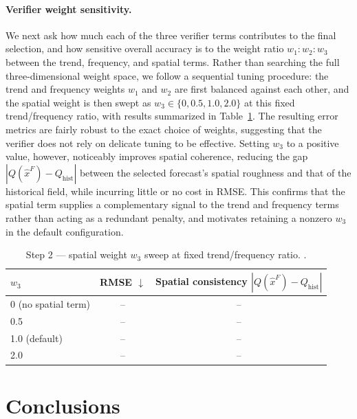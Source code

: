 \documentclass[preprint,12pt]{elsarticle}
\begin{document}
\paragraph{Verifier weight sensitivity.} We next ask how much each of the three verifier terms contributes to the final selection, and how sensitive overall accuracy is to the weight ratio $w_1{:}w_2{:}w_3$ between the trend, frequency, and spatial terms. Rather than searching the full three-dimensional weight space, we follow a sequential tuning procedure: the trend and frequency weights $w_1$ and $w_2$ are first balanced against each other, and the spatial weight is then swept as $w_3 \in \{0, 0.5, 1.0, 2.0\}$ at this fixed trend/frequency ratio, with results summarized in Table~\ref{tab:w3_sweep}. The resulting error metrics are fairly robust to the exact choice of weights, suggesting that the verifier does not rely on delicate tuning to be effective. Setting $w_3$ to a positive value, however, noticeably improves spatial coherence, reducing the gap $|Q(\hat{x}^F)-Q_{\text{hist}}|$ between the selected forecast's spatial roughness and that of the historical field, while incurring little or no cost in RMSE. This confirms that the spatial term supplies a complementary signal to the trend and frequency terms rather than acting as a redundant penalty, and motivates retaining a nonzero $w_3$ in the default configuration.
\begin{table}[H]
\centering
\caption{Step 2 — spatial weight $w_3$ sweep at fixed trend/frequency ratio. .}
\begin{tabular}{lcc}
\toprule
$w_3$ & RMSE $\downarrow$ & Spatial consistency $|Q(\hat{x}^F) - Q_{\text{hist}}|$ \\
\midrule
0 (no spatial term) & --& --\\
0.5                  & --& --\\
1.0 (default)        & --& --\\
2.0                  & --& --\\
\bottomrule
\end{tabular}
\label{tab:w3_sweep}
\end{table}



\section{Conclusions}
\label{sec:conclusion}
\end{document}
